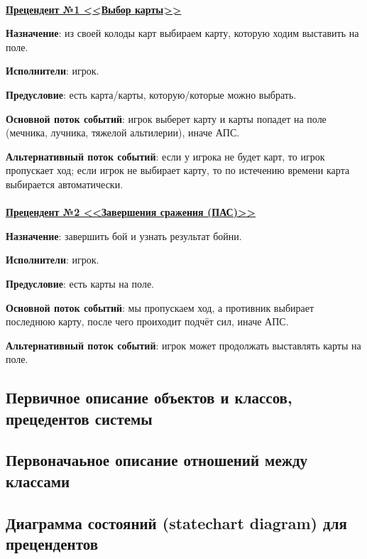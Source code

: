 \documentclass[12pt, a4paper, simple]{eskdtext}
\begin{document}
    \paragraph{}\hspace{0pt}

    \textbf{\underline{Прецендент №1 <<Выбор карты>>}}

    \textbf{Назначение}: из своей колоды карт выбираем карту, которую ходим выставить на поле.

    \textbf{Исполнители}: игрок.

    \textbf{Предусловие}: есть карта/карты, которую/которые можно выбрать.

    \textbf{Основной поток событий}: игрок выберет карту и карты попадет на поле (мечника, лучника, тяжелой альтилерии),
    иначе АПС.

    \textbf{Альтернативный поток событий}: если у игрока не будет карт, то игрок пропускает ход;
    если игрок не выбирает карту, то по истечению времени карта выбирается автоматически.

    \paragraph{}\hspace{0pt}

    \textbf{\underline{Прецендент №2 <<Завершения сражения (ПАС)>>}}

    \textbf{Назначение}: завершить бой и узнать результат бойни.

    \textbf{Исполнители}: игрок.

    \textbf{Предусловие}: есть карты на поле.

    \textbf{Основной поток событий}: мы пропускаем ход, а противник выбирает последнюю карту, после чего проиходит подчёт сил, иначе АПС.

    \textbf{Альтернативный поток событий}: игрок может продолжать выставлять карты на поле.

    \subsection{Первичное описание объектов и классов, прецедентов системы}
    \subsection{Первоначаьное описание отношений между классами}

    \newpage
    \subsection{Диаграмма состояний (statechart diagram) для прецендентов}
\end{document}
